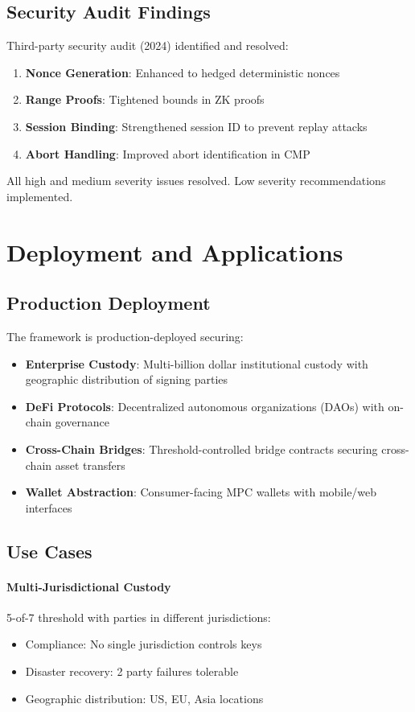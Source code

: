 \documentclass[11pt,twocolumn]{article}
\begin{document}
\subsection{Security Audit Findings}

Third-party security audit (2024) identified and resolved:
\begin{enumerate}
\item \textbf{Nonce Generation}: Enhanced to hedged deterministic nonces
\item \textbf{Range Proofs}: Tightened bounds in ZK proofs
\item \textbf{Session Binding}: Strengthened session ID to prevent replay attacks
\item \textbf{Abort Handling}: Improved abort identification in CMP
\end{enumerate}

All high and medium severity issues resolved. Low severity recommendations implemented.

\section{Deployment and Applications}

\subsection{Production Deployment}

The framework is production-deployed securing:
\begin{itemize}
\item \textbf{Enterprise Custody}: Multi-billion dollar institutional custody with geographic distribution of signing parties
\item \textbf{DeFi Protocols}: Decentralized autonomous organizations (DAOs) with on-chain governance
\item \textbf{Cross-Chain Bridges}: Threshold-controlled bridge contracts securing cross-chain asset transfers
\item \textbf{Wallet Abstraction}: Consumer-facing MPC wallets with mobile/web interfaces
\end{itemize}

\subsection{Use Cases}

\paragraph{Multi-Jurisdictional Custody} 5-of-7 threshold with parties in different jurisdictions:
\begin{itemize}
\item Compliance: No single jurisdiction controls keys
\item Disaster recovery: 2 party failures tolerable
\item Geographic distribution: US, EU, Asia locations
\end{itemize}
\end{document}
